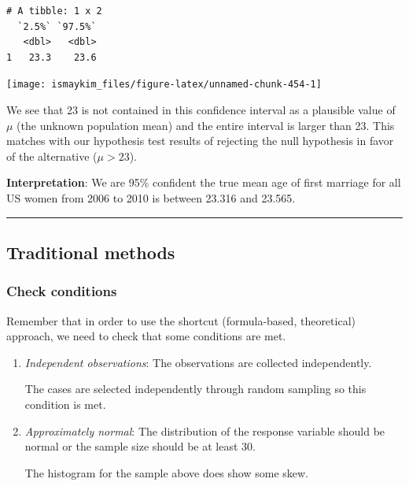 \documentclass[12pt, krantz2,]{krantz}
\makeatletter
\newenvironment{Shaded}{\begin{snugshade}}{\end{snugshade}}
\newcommand{\DataTypeTok}[1]{\textcolor[rgb]{0.27,0.27,0.27}{#1}}
\newcommand{\KeywordTok}[1]{\textcolor[rgb]{0.27,0.27,0.27}{\textbf{#1}}}
\newcommand{\NormalTok}[1]{#1}
\newcommand{\OperatorTok}[1]{\textcolor[rgb]{0.43,0.43,0.43}{\textbf{#1}}}
\newcommand{\StringTok}[1]{\textcolor[rgb]{0.5,0.5,0.5}{#1}}
\newenvironment{kframe}{%
\medskip{}
\setlength{\fboxsep}{.8em}
 \def\at@end@of@kframe{}%
 \ifinner\ifhmode%
  \def\at@end@of@kframe{\end{minipage}}%
  \begin{minipage}{\columnwidth}%
 \fi\fi%
 \def\FrameCommand##1{\hskip\@totalleftmargin \hskip-\fboxsep
 \colorbox{shadecolor}{##1}\hskip-\fboxsep
     \hskip-\linewidth \hskip-\@totalleftmargin \hskip\columnwidth}%
 \MakeFramed {\advance\hsize-\width
   \@totalleftmargin\z@ \linewidth\hsize
   \@setminipage}}%
 {\par\unskip\endMakeFramed%
 \at@end@of@kframe}
\renewenvironment{Shaded}{\begin{kframe}}{\end{kframe}}
\makeatother
\begin{document}
\begin{verbatim}
# A tibble: 1 x 2
  `2.5%` `97.5%`
   <dbl>   <dbl>
1   23.3    23.6
\end{verbatim}

\begin{Shaded}
\end{Shaded}

\begin{center}\texttt{[image: ismaykim\_files/figure-latex/unnamed-chunk-454-1]} \end{center}

We see that 23 is not contained in this confidence interval as a plausible value of \(\mu\) (the unknown population mean) and the entire interval is larger than 23. This matches with our hypothesis test results of rejecting the null hypothesis in favor of the alternative (\(\mu > 23\)).

\textbf{Interpretation}: We are 95\% confident the true mean age of first marriage for all US women from 2006 to 2010 is between 23.316 and 23.565.

\begin{center}\rule{0.5\linewidth}{\linethickness}\end{center}

\hypertarget{traditional-methods}{%
\subsection{Traditional methods}\label{traditional-methods}}

\hypertarget{check-conditions}{%
\subsubsection*{Check conditions}\label{check-conditions}}


Remember that in order to use the shortcut (formula-based, theoretical) approach, we need to check that some conditions are met.

\begin{enumerate}
\def\labelenumi{\arabic{enumi}.}
\item
  \emph{Independent observations}: The observations are collected independently.

  The cases are selected independently through random sampling so this condition is met.
\item
  \emph{Approximately normal}: The distribution of the response variable should be normal or the sample size should be at least 30.

  The histogram for the sample above does show some skew.
\end{enumerate}
\end{document}
